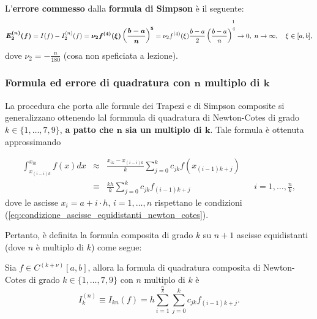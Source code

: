 \begin{definition}
    L'\textbf{errore commesso} dalla \textbf{formula di Simpson} è il seguente:
    \begin{equation}\label{eq:errFormSimpComp}
        \boldsymbol{E_2^{(n)}(f)}=I(f)-I_2^{(n)}(f)=\boldsymbol{\nu_2 f^{(4)}(\xi)\left(\frac{b-a}{n}\right)^5} = \nu_2f^{(4)}(\xi)\frac{b-a}{2}\left(\frac{b-a}{n}\right)^{\overset{\footnotemark}{4}}\rightarrow 0,\; n\rightarrow\infty,\quad \xi\in[a,b],
    \end{equation}
    dove $\nu_2 = -\frac{n}{180}$ (cosa non speficiata a lezione).
\end{definition}

\subsubsection{Formula ed errore di quadratura con \texorpdfstring{$\boldsymbol n$}{n} multiplo di \texorpdfstring{$\boldsymbol k$}{k}}
La procedura che porta alle formule dei Trapezi e di Simpson composite si generalizzano ottenendo lal formmula di quadratura di Newton-Cotes di grado $k\in\{1,\hdots, 7, 9\}$, \textbf{a patto che $\boldsymbol n$ sia un multiplo di $\boldsymbol k$}. Tale formula è ottenuta approssimando

\begin{equation*}
	\begin{matrix}
			\int_{x_{(i-i)k}}^{x_{ik}} f(x) dx &\approx&  \frac{x_{ik}-x_{(i-i)k}}{k} \sum_{j=0}^k c_{jk} f(x_{(i-1)k+j}) \\
			&\equiv& \frac{kh}{k} \sum_{j=0}^k c_{jk} f_{(i-1)k+j} && i = 1,\hdots, \frac{n}{k},
	\end{matrix}
\end{equation*}
dove le ascisse $x_i = a + i \cdot h,\, i=1,\hdots, n$ rispettano le condizioni (\ref{eq:condizione_ascisse_equidistanti_newton_cotes}).

Pertanto, è definita la formula composita di grado $k$ su $n+1$ ascisse equidistanti (dove $n$ è multiplo di $k$) come segue:
\begin{definition}
	Sia $f\in C^{(k+\nu)}[a,b]$, allora la formula di quadratura composita di Newton-Cotes di grado $k\in\{1,\hdots, 7, 9\}$ con $n$ multiplo di $k$ è
	\begin{equation*}
    	I_k^{(n)}\equiv I_{kn}(f) = h \sum_{i=1}^{\frac{n}{k}} \sum_{j=0}^{k} c_{jk} f_{(i-1)k+j} .
	\end{equation*}
\end{definition}

